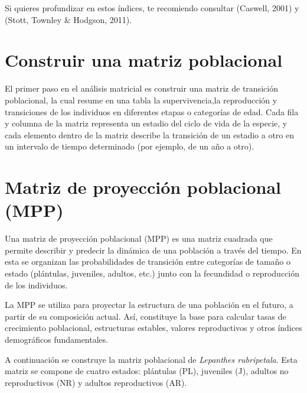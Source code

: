 \documentclass[
  12pt,
  letterpaper,
]{book}
\begin{document}
Si quieres profundizar en estos índices, te recomiendo consultar
(Caswell, 2001) y (Stott, Townley \& Hodgson, 2011).

\section{Construir una matriz
poblacional}\label{construir-una-matriz-poblacional}

El primer paso en el análisis matricial es construir una matriz de
transición poblacional, la cual resume en una tabla la supervivencia,la
reproducción y transiciones de los individuos en diferentes etapas o
categorías de edad. Cada fila y columna de la matriz representa un
estadio del ciclo de vida de la especie, y cada elemento dentro de la
matriz describe la transición de un estadio a otro en un intervalo de
tiempo determinado (por ejemplo, de un año a otro).

\section{Matriz de proyección poblacional
(MPP)}\label{matriz-de-proyecciuxf3n-poblacional-mpp}

Una matriz de proyección poblacional (MPP) es una matriz cuadrada que
permite describir y predecir la dinámica de una población a través del
tiempo. En esta se organizan las probabilidades de transición entre
categorías de tamaño o estado (plántulas, juveniles, adultos, etc.)
junto con la fecundidad o reproducción de los individuos.

La MPP se utiliza para proyectar la estructura de una población en el
futuro, a partir de su composición actual. Así, constituye la base para
calcular tasas de crecimiento poblacional, estructuras estables, valores
reproductivos y otros índices demográficos fundamentales.

A continuación se construye la matriz poblacional de \emph{Lepanthes
rubripetala}. Esta matriz se compone de cuatro estados: plántulas (PL),
juveniles (J), adultos no reproductivos (NR) y adultos reproductivos
(AR).
\end{document}
